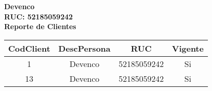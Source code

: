\documentclass{article}
\begin{document}
\begin{center}
\vspace{0.5cm}
\textbf{\Huge Devenco}\\ %
\vspace{0.2cm}
\textbf{\Large RUC: 52185059242}\\ %
\vspace{1cm}
\textbf{\Large Reporte de Clientes}
\end{center}
\vspace{1cm}
\begin{center}
\begin{tabular}{|c|c|c|c|}
\hline
CodClient & DescPersona & RUC & Vigente \\
\hline
1 & Devenco & 52185059242 & Si \\
13 & Devenco & 52185059242 & Si \\
\hline
\end{tabular}
\end{center}
\end{document}
